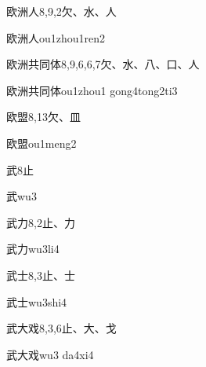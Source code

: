 \begin{Entry}{欧洲人}{8,9,2}{⽋、⽔、⼈}
  \begin{Phonetics}{欧洲人}{ou1zhou1ren2}
  \end{Phonetics}
\end{Entry}

\begin{Entry}{欧洲共同体}{8,9,6,6,7}{⽋、⽔、⼋、⼝、⼈}
  \begin{Phonetics}{欧洲共同体}{ou1zhou1 gong4tong2ti3}
  \end{Phonetics}
\end{Entry}

\begin{Entry}{欧盟}{8,13}{⽋、⽫}
  \begin{Phonetics}{欧盟}{ou1meng2}
  \end{Phonetics}
\end{Entry}

\begin{Entry}{武}{8}{⽌}
  \begin{Phonetics}{武}{wu3}
  \end{Phonetics}
\end{Entry}

\begin{Entry}{武力}{8,2}{⽌、⼒}
  \begin{Phonetics}{武力}{wu3li4}
  \end{Phonetics}
\end{Entry}

\begin{Entry}{武士}{8,3}{⽌、⼠}
  \begin{Phonetics}{武士}{wu3shi4}
  \end{Phonetics}
\end{Entry}

\begin{Entry}{武大戏}{8,3,6}{⽌、⼤、⼽}
  \begin{Phonetics}{武大戏}{wu3 da4xi4}
  \end{Phonetics}
\end{Entry}

